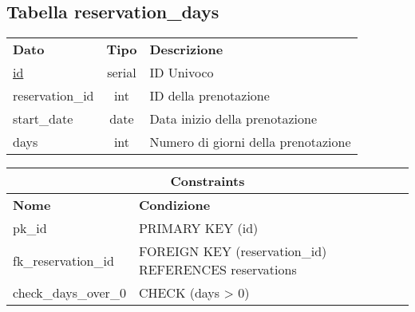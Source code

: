 \begin{center}
    \subsection*{Tabella \textnormal{reservation\_days}}
    
    \begin{tabularx}{\textwidth}{l c X}
        \toprule
        \textbf{Dato} & \textbf{Tipo} & \textbf{Descrizione}\\
        \underline{id} & serial & ID Univoco \\
        reservation\_id & int & ID della prenotazione\\
        start\_date & date & Data inizio della prenotazione\\
        days & int & Numero di giorni della prenotazione\\
        \midrule
    \end{tabularx}
    \begin{tabularx}{\textwidth}{l X}
        \multicolumn{2}{c}{\textbf{Constraints}}\\
        \midrule
        \textbf{Nome} & \textbf{Condizione}\\
        pk\_id & PRIMARY KEY (id)\\
        fk\_reservation\_id & FOREIGN KEY (reservation\_id) REFERENCES reservations\\
        check\_days\_over\_0 & CHECK (days > 0)\\
        \bottomrule
    \end{tabularx}
    \bigskip
\end{center}

